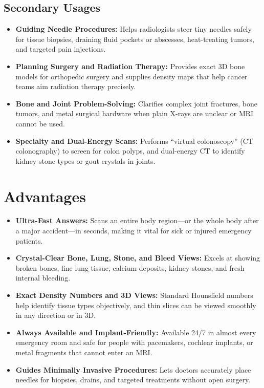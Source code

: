 \subsection{Secondary Usages}
\begin{itemize}
    \item \textbf{Guiding Needle Procedures:} Helps radiologists steer tiny needles safely for tissue biopsies, draining fluid pockets or abscesses, heat-treating tumors, and targeted pain injections.
    \item \textbf{Planning Surgery and Radiation Therapy:} Provides exact 3D bone models for orthopedic surgery and supplies density maps that help cancer teams aim radiation therapy precisely.
    \item \textbf{Bone and Joint Problem-Solving:} Clarifies complex joint fractures, bone tumors, and metal surgical hardware when plain X-rays are unclear or MRI cannot be used.
    \item \textbf{Specialty and Dual-Energy Scans:} Performs ``virtual colonoscopy'' (CT colonography) to screen for colon polyps, and dual-energy CT to identify kidney stone types or gout crystals in joints.
\end{itemize}

\section{Advantages}
\begin{itemize}
    \item \textbf{Ultra-Fast Answers:} Scans an entire body region---or the whole body after a major accident---in seconds, making it vital for sick or injured emergency patients.
    \item \textbf{Crystal-Clear Bone, Lung, Stone, and Bleed Views:} Excels at showing broken bones, fine lung tissue, calcium deposits, kidney stones, and fresh internal bleeding.
    \item \textbf{Exact Density Numbers and 3D Views:} Standard Hounsfield numbers help identify tissue types objectively, and thin slices can be viewed smoothly in any direction or in 3D.
    \item \textbf{Always Available and Implant-Friendly:} Available 24/7 in almost every emergency room and safe for people with pacemakers, cochlear implants, or metal fragments that cannot enter an MRI.
    \item \textbf{Guides Minimally Invasive Procedures:} Lets doctors accurately place needles for biopsies, drains, and targeted treatments without open surgery.
\end{itemize}


